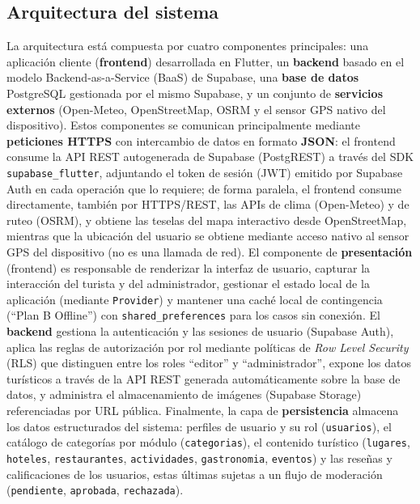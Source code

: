 
\subsection*{Arquitectura del sistema}

La arquitectura está compuesta por cuatro componentes principales: una
aplicación cliente (\textbf{frontend}) desarrollada en Flutter, un
\textbf{backend} basado en el modelo Backend-as-a-Service (BaaS) de
Supabase, una \textbf{base de datos} PostgreSQL gestionada por el mismo
Supabase, y un conjunto de \textbf{servicios externos} (Open-Meteo, OpenStreetMap,
OSRM y el sensor GPS nativo del dispositivo). Estos componentes se
comunican principalmente mediante \textbf{peticiones HTTPS} con
intercambio de datos en formato \textbf{JSON}: el frontend consume la
API REST autogenerada de Supabase (PostgREST) a través del SDK
\texttt{supabase\_flutter}, adjuntando el token de sesión (JWT) emitido
por Supabase Auth en cada operación que lo requiere; de forma paralela,
el frontend consume directamente, también por HTTPS/REST, las APIs de
clima (Open-Meteo) y de ruteo (OSRM), y obtiene las teselas del mapa
interactivo desde OpenStreetMap, mientras que la ubicación del usuario
se obtiene mediante acceso nativo al sensor GPS del dispositivo (no es
una llamada de red). El componente de \textbf{presentación} (frontend)
es responsable de renderizar la interfaz de usuario, capturar la
interacción del turista y del administrador, gestionar el estado local
de la aplicación (mediante \texttt{Provider}) y mantener una caché local
de contingencia (``Plan B Offline'') con \texttt{shared\_preferences}
para los casos sin conexión. El \textbf{backend} gestiona la
autenticación y las sesiones de usuario (Supabase Auth), aplica las
reglas de autorización por rol mediante políticas de \emph{Row Level
Security} (RLS) que distinguen entre los roles ``editor'' y
``administrador'', expone los datos turísticos a través de la API REST
generada automáticamente sobre la base de datos, y administra el
almacenamiento de imágenes (Supabase Storage) referenciadas por URL
pública. Finalmente, la capa de \textbf{persistencia} almacena los datos
estructurados del sistema: perfiles de usuario y su rol
(\texttt{usuarios}), el catálogo de categorías por módulo
(\texttt{categorias}), el contenido turístico (\texttt{lugares},
\texttt{hoteles}, \texttt{restaurantes}, \texttt{actividades},
\texttt{gastronomia}, \texttt{eventos}) y las reseñas y calificaciones
de los usuarios, estas últimas sujetas a un flujo de moderación
(\texttt{pendiente}, \texttt{aprobada}, \texttt{rechazada}).

